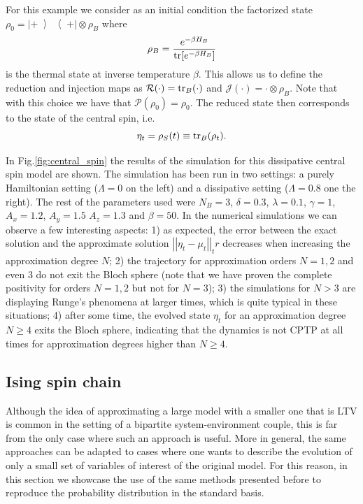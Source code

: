 \documentclass[twocolumn]{autart}    %
\newcommand{\Jc}{\mathcal{J}}
\newcommand{\Pc}{\mathcal{P}}
\newcommand{\Rc}{\mathcal{R}}
\newcommand{\tr}{{\rm tr}}
\newcommand{\norm}[1]{\left|\left| #1 \right|\right|}
\newcommand{\ketbra}[2]{\left\vert #1 \middle>\middle< #2 \right\vert}
\begin{document}
For this example we consider as an initial condition the factorized state $\rho_0 = \ketbra{+}{+} \otimes \rho_B$
where \[\rho_B = \frac{e^{-\beta H_B}}{\tr[e^{-\beta H_B}]}\]
is the thermal state at inverse temperature $\beta$. 
This allows us to define the reduction and injection maps as $\Rc(\cdot) = \tr_B(\cdot)$ and $\Jc(\cdot) = \cdot\otimes\rho_B$. Note that with this choice we have that $\Pc(\rho_0)=\rho_0$.
The reduced state then corresponds to the state of the central spin, i.e. 
\[\eta_t = \rho_S(t) \equiv \tr_B(\rho_t).\]

In Fig.\ref{fig:central_spin} the results of the simulation for this dissipative central spin model are shown. The simulation has been run in two settings: a purely Hamiltonian setting ($\Lambda=0$ on the left) and a dissipative setting ($\Lambda=0.8$ one the right). The rest of the parameters used were $N_B = 3$, $\delta=0.3$, $\lambda=0.1$, $\gamma=1$, $A_x=1.2$, $A_y=1.5$ $A_z=1.3$ and $\beta=50$. In the numerical simulations we can observe a few interesting aspects: 1) as expected, the error between the exact solution and the approximate solution $\norm{\eta_t-\mu_t}_tr$ decreases when increasing the approximation degree $N$; 2) the trajectory for approximation orders $N=1,2$ and even $3$ do not exit the Bloch sphere (note that we have proven the complete positivity for orders $N=1,2$ but not for $N=3$); 3) the simulations for $N>3$ are displaying Runge's phenomena at larger times, which is quite typical in these situations; 4) after some time, the evolved state $\eta_t$ for an approximation degree $N\geq4$ exits the Bloch sphere, indicating that the dynamics is not CPTP at all times for approximation degrees higher than $N\geq4$.


\subsection{Ising spin chain}
\label{sec:ising_model}

Although the idea of approximating a large model with a smaller one that is LTV is common in the setting of a bipartite system-environment couple, this is far from the only case where such an approach is useful. More in general, the same approaches can be adapted to cases where one wants to describe the evolution of only a small set of variables of interest of the original model. For this reason, in this section we showcase the use of the same methods presented before to reproduce the probability distribution in the standard basis. 
\end{document}
